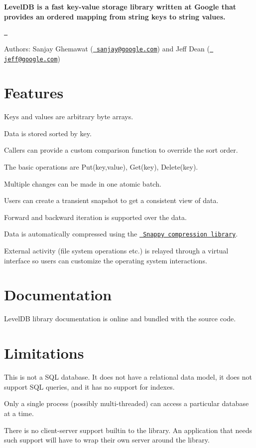 {\bfseries{Level\+DB is a fast key-\/value storage library written at Google that provides an ordered mapping from string keys to string values.}}

\href{https://travis-ci.org/google/leveldb}{\texttt{ }}

Authors\+: Sanjay Ghemawat (\href{mailto:sanjay@google.com}{\texttt{ sanjay@google.\+com}}) and Jeff Dean (\href{mailto:jeff@google.com}{\texttt{ jeff@google.\+com}})

\section*{Features}


\begin{DoxyItemize}
\item Keys and values are arbitrary byte arrays.
\item Data is stored sorted by key.
\item Callers can provide a custom comparison function to override the sort order.
\item The basic operations are {\ttfamily Put(key,value)}, {\ttfamily Get(key)}, {\ttfamily Delete(key)}.
\item Multiple changes can be made in one atomic batch.
\item Users can create a transient snapshot to get a consistent view of data.
\item Forward and backward iteration is supported over the data.
\item Data is automatically compressed using the \href{http://google.github.io/snappy/}{\texttt{ Snappy compression library}}.
\item External activity (file system operations etc.) is relayed through a virtual interface so users can customize the operating system interactions.
\end{DoxyItemize}

\section*{Documentation}

Level\+DB library documentation is online and bundled with the source code.

\section*{Limitations}


\begin{DoxyItemize}
\item This is not a S\+QL database. It does not have a relational data model, it does not support S\+QL queries, and it has no support for indexes.
\item Only a single process (possibly multi-\/threaded) can access a particular database at a time.
\item There is no client-\/server support builtin to the library. An application that needs such support will have to wrap their own server around the library.
\end{DoxyItemize}

